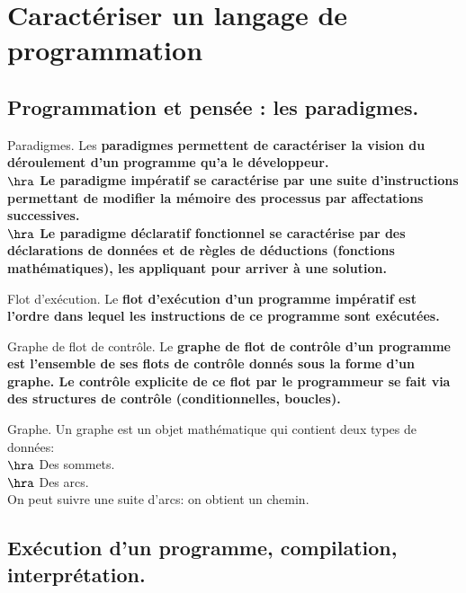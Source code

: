 \documentclass[french, 11pt]{article}
\begin{document}


\section{Caractériser un langage de programmation}

\subsection{Programmation et pensée : les paradigmes.}

\begin{defi}{Paradigmes.}{}
    Les \bf{paradigmes} permettent de caractériser la vision du déroulement d'un programme qu'a le développeur.\\
    $\hra$ Le paradigme impératif se caractérise par une suite d'instructions permettant de modifier la mémoire des processus par affectations successives.\\
    $\hra$ Le paradigme déclaratif fonctionnel se caractérise par des déclarations de données et de règles de déductions (fonctions mathématiques), les appliquant pour arriver à une solution.
\end{defi}

\begin{defi}{Flot d'exécution.}{}
    Le \bf{flot d'exécution} d'un programme impératif est l'ordre dans lequel les instructions de ce programme sont exécutées. 
\end{defi}

\begin{defi}{Graphe de flot de contrôle.}{}
    Le \bf{graphe de flot de contrôle} d'un programme est l'ensemble de ses flots de contrôle donnés sous la forme d'un graphe.\n
    Le contrôle explicite de ce flot par le programmeur se fait via des structures de contrôle (conditionnelles, boucles).
\end{defi}

\begin{defi}{Graphe.}{}
    Un graphe est un objet mathématique qui contient deux types de données:\\
    $\hra$ Des sommets.\\
    $\hra$ Des arcs.\\
    On peut suivre une suite d'arcs: on obtient un chemin.
\end{defi}

\subsection{Exécution d'un programme, compilation, interprétation.}
\end{document}
